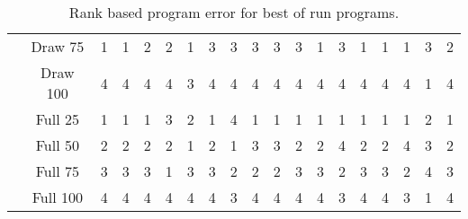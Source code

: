 \begin{table*}[ht]
\begin{tabular}{ c | c  |c c c c c c c c c c c c c c c c c }
 & Draw 75 & 1 & 1 & 2 & 2 & 1 & 3 & 3 & 3 & 3 & 3 & 1 & 3 & 1 & 1 & 1 & 3 & 2 \\
 & Draw 100 & 4 & 4 & 4 & 4 & 3 & 4 & 4 & 4 & 4 & 4 & 4 & 4 & 4 & 4 & 4 & 1 & 4 \\
 \hline
 & Full 25 & 1 & 1 & 1 & 3 & 2 & 1 & 4 & 1 & 1 & 1 & 1 & 1 & 1 & 1 & 1 & 2 & 1 \\
 & Full 50 & 2 & 2 & 2 & 2 & 1 & 2 & 1 & 3 & 3 & 2 & 2 & 4 & 2 & 2 & 4 & 3 & 2 \\
 & Full 75 & 3 & 3 & 3 & 1 & 3 & 3 & 2 & 2 & 2 & 3 & 3 & 2 & 3 & 3 & 2 & 4 & 3 \\
 & Full 100 & 4 & 4 & 4 & 4 & 4 & 4 & 3 & 4 & 4 & 4 & 4 & 3 & 4 & 4 & 3 & 1 & 4 \\
\end{tabular}
\caption{Rank based program error for best of run programs.}
\label{table:rank_program_error_draw_full}
\end{table*}